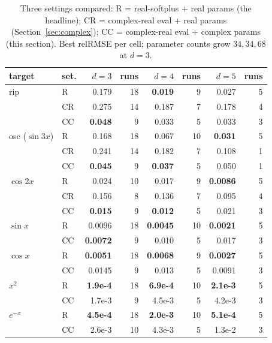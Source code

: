 \documentclass[11pt]{article}
\begin{document}
\begin{table}[h]
\centering\small
\caption{Three settings compared: R = real-softplus + real params (the
headline); CR = complex-real eval + real params (Section~\ref{sec:complex});
CC = complex-real eval + complex params (this section). Best relRMSE per cell;
parameter counts grow $34, 34, 68$ at $d{=}3$.}
\label{tab:cc}
\begin{tabular}{llrrrrrr}
\toprule
target & set. & $d{=}3$ & runs & $d{=}4$ & runs & $d{=}5$ & runs \\
\midrule
rip   & R  & 0.179 & 18 & \textbf{0.019} & 9 & 0.027 & 5 \\
      & CR & 0.275 & 14 & 0.187 & 7 & 0.178 & 4 \\
      & CC & \textbf{0.048} & 9 & 0.033 & 5 & 0.033 & 3 \\
\midrule
osc ($\sin 3x$) & R  & 0.168 & 18 & 0.067 & 10 & \textbf{0.031} & 5 \\
                & CR & 0.241 & 14 & 0.182 & 7 & 0.108 & 1 \\
                & CC & \textbf{0.045} & 9 & \textbf{0.037} & 5 & 0.050 & 1 \\
\midrule
$\cos 2x$ & R  & 0.024 & 10 & 0.017 & 9 & \textbf{0.0086} & 5 \\
          & CR & 0.156 & 8  & 0.136 & 7 & 0.095 & 4 \\
          & CC & \textbf{0.015} & 9 & \textbf{0.012} & 5 & 0.021 & 3 \\
\midrule
$\sin x$  & R  & 0.0096 & 18 & \textbf{0.0045} & 10 & \textbf{0.0021} & 5 \\
          & CC & \textbf{0.0072} & 9 & 0.010 & 5 & 0.017 & 3 \\
\midrule
$\cos x$  & R  & \textbf{0.0051} & 18 & \textbf{0.0068} & 9 & \textbf{0.0027} & 5 \\
          & CC & 0.0145 & 9 & 0.013 & 5 & 0.0091 & 3 \\
\midrule
$x^2$       & R  & \textbf{1.9e-4} & 18 & \textbf{6.9e-4} & 10 & \textbf{2.1e-3} & 5 \\
            & CC & 1.7e-3 & 9 & 4.5e-3 & 5 & 4.2e-3 & 3 \\
\midrule
$e^{-x}$    & R  & \textbf{4.5e-4} & 18 & \textbf{2.0e-3} & 10 & \textbf{5.1e-4} & 5 \\
            & CC & 2.6e-3 & 10 & 4.3e-3 & 5 & 1.3e-2 & 3 \\
\bottomrule
\end{tabular}
\end{table}
\end{document}
